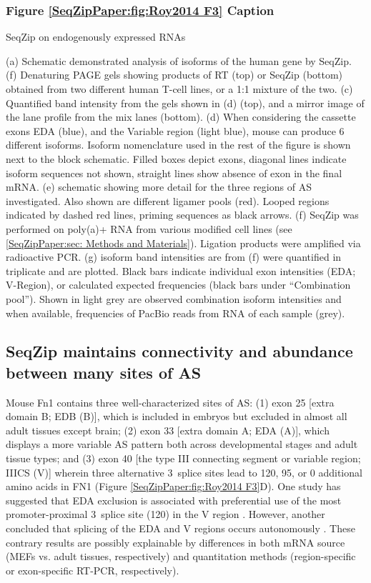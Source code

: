 			\subsubsection{Figure \ref{SeqZipPaper:fig:Roy2014 F3} Caption}
				\label{SeqZipPaper:figCap: Roy2014 F3}

				SeqZip on endogenously expressed RNAs

				(a) Schematic demonstrated analysis of isoforms of the human \cd{} gene by SeqZip.
				(f) Denaturing PAGE gels showing products of RT (top) or SeqZip (bottom) \cd{} obtained from two different human T-cell lines, or a 1:1 mixture of the two.
				(c) Quantified band intensity from the gels shown in (d) (top), and a mirror image of the lane profile from the mix lanes (bottom).
				(d) When considering the cassette exons EDA (blue), and the Variable region (light blue), mouse \fn{} can produce 6 different isoforms. Isoform nomenclature used in the rest of the figure is shown next to the block schematic. Filled boxes depict exons, diagonal lines indicate isoform sequences not shown, straight lines show absence of exon in the final mRNA.
				(e) schematic showing more detail for the three regions of \fn{} AS investigated. Also shown are different ligamer pools (red). Looped regions indicated by dashed red lines, priming sequences as black arrows. 
				 (f) SeqZip was performed on poly(a)+ RNA from various \fn{} modified cell lines (see \ref{SeqZipPaper:sec: Methods and Materials}). Ligation products were amplified via radioactive PCR. 
				(g) isoform band intensities are from (f) were quantified in triplicate and are plotted. Black bars indicate individual exon intensities (EDA; V-Region), or calculated expected frequencies (black bars under ``Combination pool''). Shown in light grey are observed combination isoform intensities and when available, frequencies of PacBio reads from RNA of each sample (grey). 

	\subsection{SeqZip maintains connectivity and abundance between many sites of AS}
		\label{SeqZipPaper:subsec: SeqZip Maintains Connectivity}

		Mouse Fn1 contains three well-characterized sites of AS: (1) exon 25 [extra domain B; EDB (B)], which is included in embryos but excluded in almost all adult tissues except brain; (2) exon 33 [extra domain A; EDA (A)], which displays a more variable AS pattern both across developmental stages and adult tissue types; and (3) exon 40 [the type III connecting segment or variable region; IIICS (V)] wherein three alternative 3\textprime~splice sites lead to 120, 95, or 0 additional amino acids in FN1 (Figure \ref{SeqZipPaper:fig:Roy2014 F3}D). One study has suggested that EDA exclusion is associated with preferential use of the most promoter-proximal 3\textprime~splice site (120) in the V region \citep{Fededa2005}. However, another concluded that splicing of the EDA and V regions occurs autonomously \citep{Chauhan2004}. These contrary results are possibly explainable by differences in both mRNA source (MEFs vs. adult tissues, respectively) and quantitation methods (region-specific or exon-specific RT-PCR, respectively).

